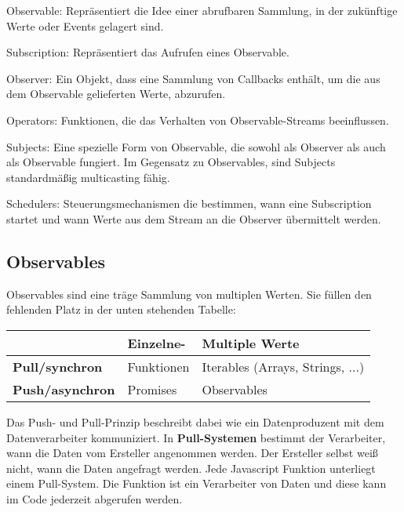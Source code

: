 \begin{description}
    \item Observable: Repräsentiert die Idee einer abrufbaren Sammlung, in der zukünftige Werte oder Events gelagert sind.
    \item Subscription: Repräsentiert das Aufrufen eines Observable.
    \item Observer: Ein Objekt, dass eine Sammlung von Callbacks enthält, um die aus dem Observable gelieferten Werte, abzurufen.
    \item Operators: Funktionen, die das Verhalten von Observable-Streams beeinflussen.
    \item Subjects: Eine spezielle Form von Observable, die sowohl als Observer als auch als Observable fungiert. Im Gegensatz zu Observables, sind Subjects standardmäßig multicasting fähig.
    \item Schedulers: Steuerungsmechanismen die bestimmen, wann eine Subscription startet und wann Werte aus dem Stream an die Observer übermittelt werden.
\end{description}


\subsection{Observables}

Observables sind eine träge Sammlung von multiplen Werten. Sie füllen den fehlenden Platz in der unten stehenden Tabelle:

\begin{center}
    \begin{tabular}{| l | l | l |}
    \hline
    & \textbf{Einzelne-} & \textbf{Multiple Werte} \\ \hline
    \textbf{Pull/synchron} & Funktionen & Iterables (Arrays, Strings, ...) \\ \hline
    \textbf{Push/asynchron} & Promises & Observables  \\ \hline
    \end{tabular}
\end{center}

\noindent
Das Push- und Pull-Prinzip beschreibt dabei wie ein Datenproduzent mit dem Datenverarbeiter kommuniziert. In \textbf{Pull-Systemen} bestimmt der Verarbeiter, wann die Daten vom Ersteller angenommen werden. Der Ersteller selbst weiß nicht, wann die Daten angefragt werden. Jede Javascript Funktion unterliegt einem Pull-System. Die Funktion ist ein Verarbeiter von Daten und diese kann im Code jederzeit abgerufen werden.\\

